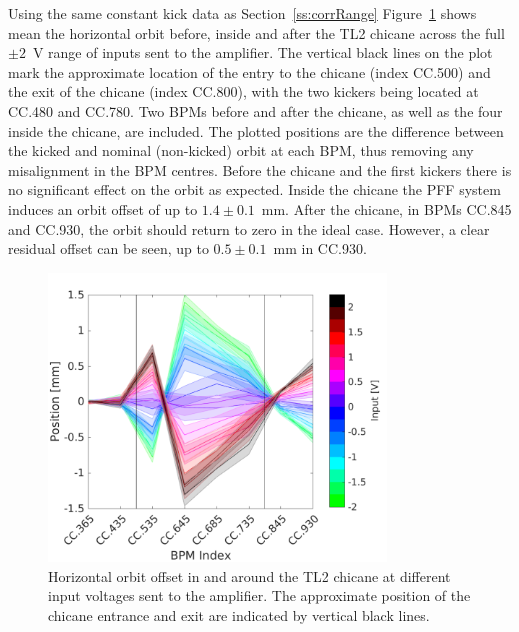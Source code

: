Using the same constant kick data as Section~\ref{ss:corrRange} Figure~\ref{f:HOrbitVsInput} shows mean the horizontal orbit before, inside and after the TL2 chicane across the full \(\pm2\)~V range of inputs sent to the amplifier. The vertical black lines on the plot mark the approximate location of the entry to the chicane (index CC.500) and the exit of the chicane (index CC.800), with the two kickers being located at CC.480 and CC.780. Two BPMs before and after the chicane, as well as the four inside the chicane, are included. The plotted positions are the difference between the kicked and nominal (non-kicked) orbit at each BPM, thus removing any misalignment in the BPM centres. Before the chicane and the first kickers there is no significant effect on the orbit as expected. Inside the chicane the PFF system induces an orbit offset of up to \(1.4\pm0.1\)~mm. After the chicane, in BPMs CC.845 and CC.930, the orbit should return to zero in the ideal case. However, a clear residual offset can be seen, up to \(0.5\pm0.1\)~mm in CC.930.

\begin{figure}
  \centering
  \includegraphics[width=0.8\textwidth]{Figures/commissioning/HOrbitVsInput}
  \caption{Horizontal orbit offset in and around the TL2 chicane at different input voltages sent to the amplifier. The approximate position of the chicane entrance and exit are indicated by vertical black lines.}
  \label{f:HOrbitVsInput}
\end{figure}

